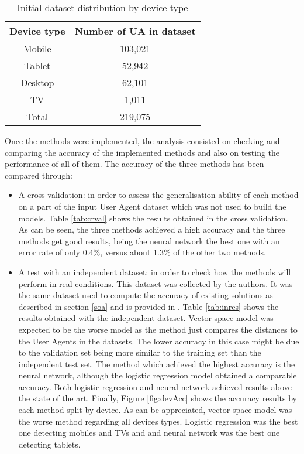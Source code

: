 \begin{table}
	\centering
	\caption{Initial dataset distribution by device type}
	\label{tab:dbdist}
	\begin{tabular}{||c|c||}
		\hline
		\textbf{Device type}&\textbf{Number of UA in dataset} \\
		\hline
		Mobile & 103,021\\
		Tablet & 52,942\\
		Desktop & 62,101\\
		TV & 1,011 \\
		\hline
		Total & 219,075 \\
		\hline
	\end{tabular}
\end{table}

Once the methods were implemented, the analysis consisted on checking and comparing the accuracy of the implemented methods and also on testing the performance of all of them. The accuracy of the three methods has been compared through:
\begin{itemize}
	\item A cross validation: in order to assess the generalisation ability of each method on a part of the input User Agent dataset which was not used to build the models. Table \ref{tab:crval} shows the results obtained in the cross validation. As can be seen, the three methods achieved a high accuracy and the three methods get good results, being the neural network the best one with an error rate of only 0.4\%, versus about 1.3\% of the other two methods.
	\item A test with an independent dataset: in order to check how the methods will perform in real conditions. This dataset was collected by the authors. It was the same dataset used to compute the accuracy of existing solutions as described in section \ref{soa} and is provided in \cite{uagit}. Table \ref{tab:inres} shows the results obtained with the independent dataset. Vector space model was expected to be the worse model as the method just compares the distances to the User Agents in the datasets. The lower accuracy in this case might be due to the validation set being more similar to the training set than the independent test set. The method which achieved the highest accuracy is the neural network, although the logistic regression model obtained a comparable accuracy. Both logistic regression and neural network achieved results above the state of the art. Finally, Figure \ref{fig:devAcc} shows the accuracy results by each method split by device.
	As can be appreciated, vector space model was the worse method regarding all devices types. Logistic regression was the best one detecting mobiles and TVs and and neural network was the best one detecting tablets.
\end{itemize}

